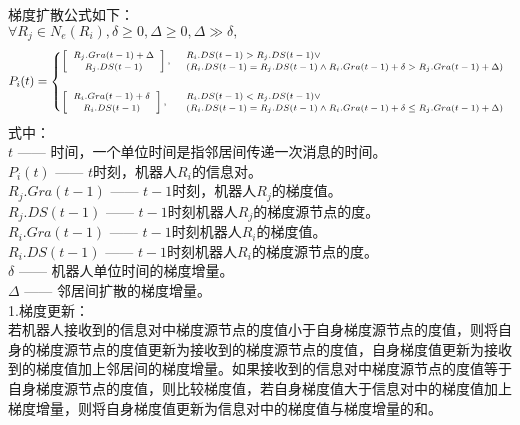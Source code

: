 梯度扩散公式如下：\\
${ \forall R_j \in N_e(R_i), \delta \geq 0, \Delta \geq 0, \Delta \gg \delta,}$ \\
\begin{equation}\scriptsize
	P_i(t) = 
	\begin{cases}
		\vspace{0.5cm}
		\left[
		\begin{array}{c}
			R_j.Gra(t-1) + \Delta \\
			R_j.DS(t-1)
		\end{array}
		\right], & 
		\begin{array}{l}
			R_i.DS(t-1) > R_j.DS(t-1) \vee \\
			(R_i.DS(t-1) = R_j.DS(t-1) \wedge R_i.Gra(t-1) +\delta > R_j.Gra(t-1) + \Delta)
		\end{array} \\
		
		\left[
		\begin{array}{c}
		R_i.Gra(t-1) + \delta \\
		R_i.DS(t-1)
		\end{array}
		\right], & 
		\begin{array}{l}
			R_i.DS(t-1) < R_j.DS(t-1) \vee \\
			(R_i.DS(t-1) = R_j.DS(t-1) \wedge R_i.Gra(t-1) +\delta \leq R_j.Gra(t-1) + \Delta)
		\end{array}		
	\end{cases} 
\end{equation}
式中：\\
\indent $t$ —— 时间，一个单位时间是指邻居间传递一次消息的时间。\\
\indent $P_i(t)$ —— $t$时刻，机器人$R_i$的信息对。\\
\indent $R_j.Gra(t-1)$ —— $t-1$时刻，机器人$R_j$的梯度值。\\
\indent $R_j.DS(t-1)$ —— $t-1$时刻机器人$R_j$的梯度源节点的度。\\
\indent $R_i.Gra(t-1)$ —— $t-1$时刻机器人$R_i$的梯度值。\\
\indent $R_i.DS(t-1)$ —— $t-1$时刻机器人$R_i$的梯度源节点的度。\\
\indent $\delta$ —— 机器人单位时间的梯度增量。\\
\indent $\Delta$ —— 邻居间扩散的梯度增量。\\

1.梯度更新：\\
\indent 若机器人接收到的信息对中梯度源节点的度值小于自身梯度源节点的度值，则将自身的梯度源节点的度值更新为接收到的梯度源节点的度值，自身梯度值更新为接收到的梯度值加上邻居间的梯度增量。如果接收到的信息对中梯度源节点的度值等于自身梯度源节点的度值，则比较梯度值，若自身梯度值大于信息对中的梯度值加上梯度增量，则将自身梯度值更新为信息对中的梯度值与梯度增量的和。\\

